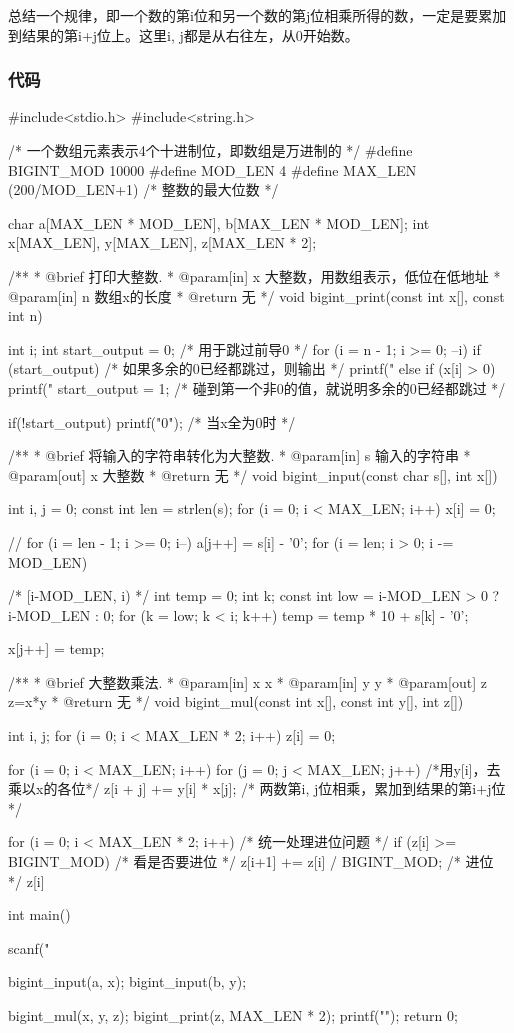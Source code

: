 总结一个规律，即一个数的第i位和另一个数的第j位相乘所得的数，一定是要累加到结果的第i+j位上。这里i, j都是从右往左，从0开始数。

\subsubsection{代码}
\begin{Codex}[label=bigint_mul.c]
#include<stdio.h>
#include<string.h>

/* 一个数组元素表示4个十进制位，即数组是万进制的 */
#define BIGINT_MOD 10000
#define MOD_LEN 4
#define MAX_LEN (200/MOD_LEN+1)  /* 整数的最大位数 */

char    a[MAX_LEN * MOD_LEN], b[MAX_LEN * MOD_LEN];
int     x[MAX_LEN], y[MAX_LEN], z[MAX_LEN * 2];

/**
 * @brief 打印大整数.
 * @param[in] x 大整数，用数组表示，低位在低地址
 * @param[in] n 数组x的长度
 * @return 无
 */
void bigint_print(const int x[], const int n) {
    int i;
    int start_output = 0;  /* 用于跳过前导0 */
    for (i = n - 1; i >= 0; --i) {
        if (start_output) {  /* 如果多余的0已经都跳过，则输出 */
            printf("%
        } else if (x[i] > 0) {
            printf("%
            start_output = 1; /* 碰到第一个非0的值，就说明多余的0已经都跳过 */
        }
    }

    if(!start_output) printf("0");  /* 当x全为0时 */
}

/**
 * @brief 将输入的字符串转化为大整数.
 * @param[in] s 输入的字符串
 * @param[out] x 大整数
 * @return 无
 */
void bigint_input(const char s[], int x[]) {
    int i, j = 0;
    const int len = strlen(s);
    for (i = 0; i < MAX_LEN; i++) x[i] = 0;

    // for (i = len - 1; i >= 0; i--) a[j++] = s[i] - '0';
    for (i = len; i > 0; i -= MOD_LEN) {  /* [i-MOD_LEN, i) */
        int temp = 0;
        int k;
        const int low = i-MOD_LEN > 0 ? i-MOD_LEN : 0;
        for (k = low; k < i; k++) {
            temp = temp * 10 + s[k] - '0';
        }

        x[j++] = temp;
    }
}

/**
 * @brief 大整数乘法.
 * @param[in] x x
 * @param[in] y y
 * @param[out] z z=x*y
 * @return 无
 */
void bigint_mul(const int x[], const int y[], int z[]) {
    int i, j;
    for (i = 0; i < MAX_LEN * 2; i++) z[i] = 0;

    for (i = 0; i < MAX_LEN; i++) {
        for (j = 0; j < MAX_LEN; j++) { /*用y[i]，去乘以x的各位*/
            z[i + j] += y[i] * x[j];  /* 两数第i, j位相乘，累加到结果的第i+j位 */
        }
    }
    
    for (i = 0; i < MAX_LEN * 2; i++) {  /* 统一处理进位问题 */
        if (z[i] >= BIGINT_MOD) {  /* 看是否要进位 */
            z[i+1] += z[i] / BIGINT_MOD;  /* 进位 */
            z[i] %
        }
    }
}


int main() {
    scanf("%

    bigint_input(a, x);
    bigint_input(b, y);

    bigint_mul(x, y, z);
    bigint_print(z, MAX_LEN * 2);
    printf("\n"); 
    return 0;
}
\end{Codex}

